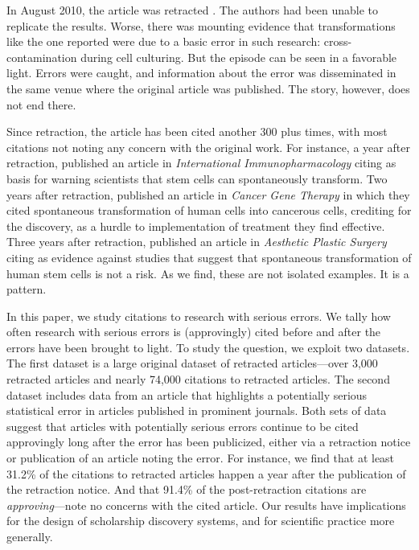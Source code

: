\documentclass[12pt, letterpaper]{article}
\begin{document}
In August 2010, the article was retracted \citep{de2010retraction}. The authors had been unable to replicate the results. Worse, there was mounting evidence that transformations like the one reported were due to a basic error in such research: cross-contamination during cell culturing. But the episode can be seen in a favorable light. Errors were caught, and information about the error was disseminated in the same venue where the original article was published. The story, however, does not end there.

Since retraction, the article has been cited another 300 plus times, with most citations not noting any concern with the original work. For instance, a year after retraction, \citet{firinci2011mesenchymal} published an article in \textit{International Immunopharmacology} citing \citeauthor{rubio2005spontaneous} as basis for warning scientists that stem cells can spontaneously transform. Two years after retraction, \citet{kosaka2012therapeutic} published an article in \textit{Cancer Gene Therapy} in which they cited spontaneous transformation of human cells into cancerous cells, crediting \citeauthor{rubio2005spontaneous} for the discovery, as a hurdle to implementation of treatment they find effective. Three years after retraction, \citet{chang2013safety} published an article in \textit{Aesthetic Plastic Surgery} citing \citeauthor{rubio2005spontaneous} as evidence against studies that suggest that spontaneous transformation of human stem cells is not a risk. As we find, these are not isolated examples. It is a pattern. 

In this paper, we study citations to research with serious errors. We tally how often research with serious errors is (approvingly) cited before and after the errors have been brought to light. To study the question, we exploit two datasets. The first dataset is a large original dataset of retracted articles---over 3,000 retracted articles and nearly 74,000 citations to retracted articles. The second dataset includes data from an article that highlights a potentially serious statistical error in articles published in prominent journals. Both sets of data suggest that articles with potentially serious errors continue to be cited approvingly long after the error has been publicized, either via a retraction notice or publication of an article noting the error. For instance, we find that at least 31.2\% of the citations to retracted articles happen a year after the publication of the retraction notice. And that 91.4\% of the post-retraction citations are \textit{approving}---note no concerns with the cited article. Our results have implications for the design of scholarship discovery systems, and for scientific practice more generally.
\end{document}
